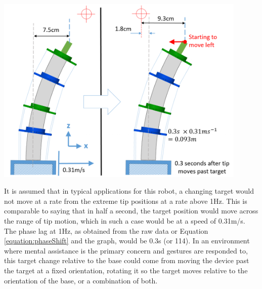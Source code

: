 \documentclass[11pt]{article}
\begin{document}
\begin{center}
\includegraphics[width=0.9\textwidth]{images/baseOvershoot.png}
\label{figure:baseOvershoot}
\end{center}


It is assumed that in typical applications for this robot, a changing target would not move at a rate from the extreme tip positions at a rate above 1Hz. This is comparable to saying that in half a second, the target position would move across the range of tip motion, which in such a case would be at a speed of 0.31m/s. The phase lag at 1Hz, as obtained from the raw data or Equation \ref{equation:phaseShift} and the graph, would be 0.3s (or 114\degree). In an environment where mental assistance is the primary concern and gestures are responded to, this target change relative to the base could come from moving the device past the target at a fixed orientation, rotating it so the target moves relative to the orientation of the base, or a combination of both.
\end{document}
